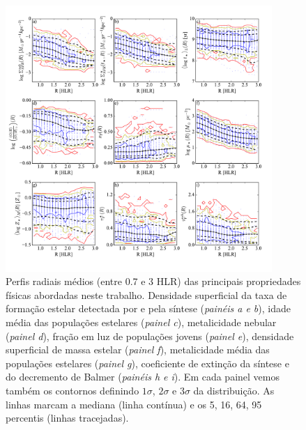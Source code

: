 \begin{figure}
	\centering
	\includegraphics[width=0.9\textwidth]{figuras/props_R.pdf}
	\caption[Perfis radiais das propriedades físicas]
	{Perfis radiais médios (entre 0.7 e 3 HLR) das principais propriedades físicas abordadas neste
trabalho. Densidade superficial da taxa de formação estelar detectada por \Halpha e pela síntese
({\em painéis a e b}), idade média das populações estelares ({\em painel c}), metalicidade nebular
({\em painel d}), fração em luz de populações jovens ({\em painel e}), densidade superficial de
massa estelar ({\em painel f}), metalicidade média das populações estelares ({\em painel g}),
coeficiente de extinção da síntese e do decremento de Balmer ({\em painéis h e i}). Em cada painel
vemos também os contornos definindo $1\sigma$, $2\sigma$ e $3\sigma$ da distribuição. As linhas
marcam a mediana (linha contínua) e os 5, 16, 64, 95 percentis (linhas tracejadas).}
	\label{fig:RadProfProps}
\end{figure}

